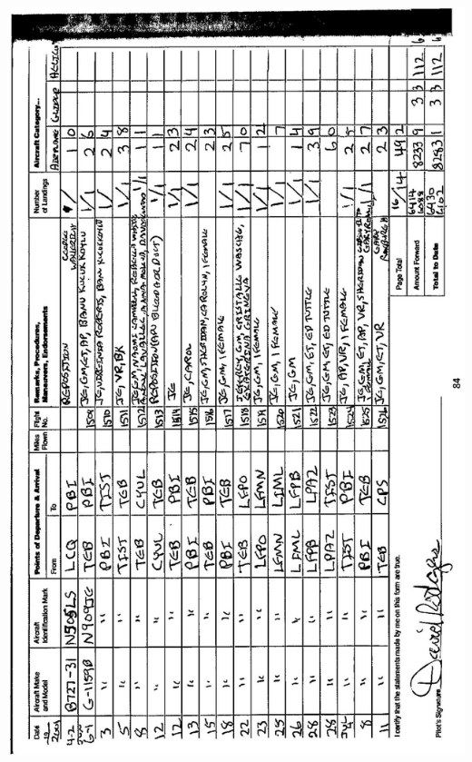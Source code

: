 \documentclass[10pt]{article}
\begin{document}
\includegraphics[max width=\textwidth, center]{2025_02_27_dd68c3d38de88f0516d9g-088}\\
\end{document}
